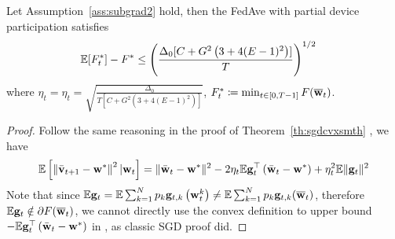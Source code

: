 \begin{theorem}
	Let Assumption~\ref{ass:subgrad2} hold, 
	then the FedAve with partial device participation satisfies
	\begin{align}
		 \mathbb{E}[F^*_t] - F^* &\leq  \left(\frac{\Delta_0[C+ G^2 \left(3 + 4(E-1)^2\right)]}{T}\right)^{1/2}
	\end{align}
	where $\eta_t = \eta_t  = \sqrt{ \frac{\Delta_0}{T[C+ G^2 \left(3 + 4(E-1)^2\right)]}}$,
	$F^*_t \coloneqq \min_{t \in [0, T-1]} F(\overline{{\mathbf{w}}}_t)$.
\end{theorem}
\begin{proof}
Follow the same reasoning in the proof of Theorem~\ref{th:sgdcvxsmth} \eq{\ref{eq:expandsgd}}, we have
\begin{align}
\mathbb{E}\left[\left\|\bar{{\mathbf{v}}}_{t+1}-{\mathbf{w}}^{*}\right\|^2| {\mathbf{w}}_{t}\right]=\|\bar{{\mathbf{w}}}_{t}-{\mathbf{w}}^{*}\|^{2}-2 \eta_{t} \mathbb{E} {\mathbf{g}}_{t}^{\top}\left(\bar{{\mathbf{w}}}_{t}-{\mathbf{w}}^{*}\right)+\eta_{t}^{2} \mathbb{E}\| {\mathbf{g}}_{t} \|^{2}	
\label{eq:expand}
\end{align}
Note that since $\mathbb{E} {\mathbf{g}}_t = \mathbb{E} \sum_{k=1}^{N} p_{k} {\mathbf{g}}_{t, k}\left({\mathbf{w}}_{t}^{k}\right) \neq \mathbb{E} \sum_{k=1}^Np_k {\mathbf{g}}_{t,k}(\overline{{\mathbf{w}}}_t)$, therefore $\mathbb{E} {\mathbf{g}}_t \notin \partial F(\overline{{\mathbf{w}}}_t)$, we cannot directly use the convex definition to
upper bound $- \mathbb{E} {\mathbf{g}}_{t}^{\top}\left(\bar{{\mathbf{w}}}_{t}-{\mathbf{w}}^{*}\right)$ in \eq{\ref{eq:expand}}, as classic SGD proof did. 


\end{proof}
